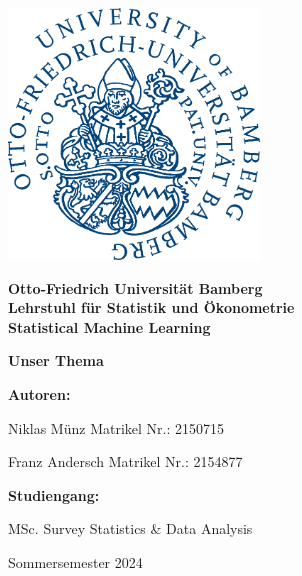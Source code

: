 \begin{titlepage}
	\begin{center}
		
		\includegraphics[width=0.5\textwidth]{images/UB-Logo-blau.png}
		
		\LARGE
		\textbf{Otto-Friedrich Universität Bamberg}\\
		\textbf{Lehrstuhl für Statistik und Ökonometrie}\\
		\textbf{Statistical Machine Learning}
		
		
		\vspace*{1.5cm}
		
		\Huge
		\textbf{Unser Thema}
		
		
		\vspace{2cm}
		
		\Large
		\begin{minipage}[t]{0.4\textwidth}
			\textbf{Autoren:}
		\end{minipage}
		\hfill
		\begin{minipage}[t]{0.3\textwidth}
			Niklas Münz\newline
			Matrikel Nr.: 2150715
			
			\vspace{0.3cm}
			
			Franz Andersch\newline
			Matrikel Nr.: 2154877
			
		\end{minipage}
		
		\vspace{0.5cm}
		
		\Large
		\begin{minipage}[t]{0.4\textwidth}
			\textbf{Studiengang:}
		\end{minipage}
		\hfill
		\begin{minipage}[t]{0.3\textwidth}
			MSc. Survey Statistics \newline
			\& Data Analysis
		\end{minipage}
		
		\vfill
		Sommersemester 2024
		
	\end{center}
\end{titlepage}